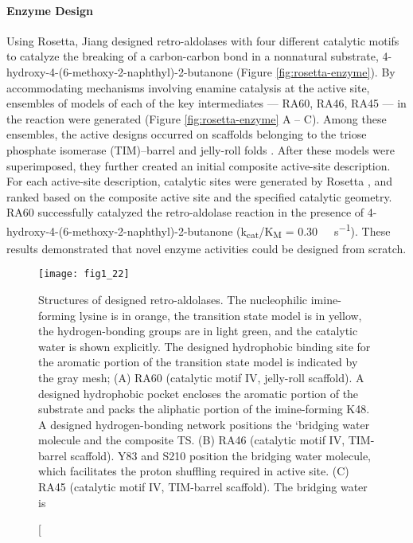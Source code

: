 \begin{refsection}
\paragraph{Enzyme Design}

Using Rosetta, Jiang  designed retro-aldolases with four
different catalytic motifs to catalyze the breaking of a carbon-carbon bond in
a nonnatural substrate, 4-hydroxy-4-(6-methoxy-2-naphthyl)-2-butanone
\cite{Jiang2008} (Figure \ref{fig:rosetta-enzyme}). By accommodating mechanisms
involving enamine catalysis at the active site, ensembles of models of each of
the key intermediates --- RA60, RA46, RA45 --- in the reaction were generated
(Figure \ref{fig:rosetta-enzyme} A -- C). Among these ensembles, the active
designs occurred on scaffolds belonging to the triose phosphate isomerase
(TIM)–barrel and jelly-roll folds \cite{Jiang2008}. After these models were
superimposed, they further created an initial composite active-site
description. For each active-site description, catalytic sites were generated
by Rosetta \cite{Jiang2008}, and ranked based on the composite active site and
the specified catalytic geometry. RA60 successfully catalyzed the
retro-aldolase reaction in the presence of
4-hydroxy-4-(6-methoxy-2-naphthyl)-2-butanone
(k\textsubscript{cat}/K\textsubscript{M} = \SI{0.30}{\per\Molar\per\second}).
These results demonstrated that novel enzyme activities could be designed from
scratch.
\begin{figure}[htbp] \centering \texttt{[image: fig1\_22]}
    \caption[Structures of designed retro-aldolases. The nucleophilic
        imine-forming lysine is in orange, the transition state model is in
        yellow, the hydrogen-bonding groups are in light green, and the
        catalytic water is shown explicitly.  The designed hydrophobic binding
        site for the aromatic portion of the transition state model is
        indicated by the gray mesh; (A) RA60 (catalytic motif IV, jelly-roll
        scaffold). A designed hydrophobic pocket encloses the aromatic portion
        of the substrate and packs the aliphatic portion of the imine-forming
        K48. A designed hydrogen-bonding network positions the `bridging water
        molecule and the composite TS. (B) RA46 (catalytic motif IV, TIM-barrel
        scaffold). Y83 and S210 position the bridging water molecule, which
        facilitates the proton shuffling required in active site. (C) RA45
        (catalytic motif IV, TIM-barrel scaffold). The bridging water is

\end{figure}
\end{refsection}
